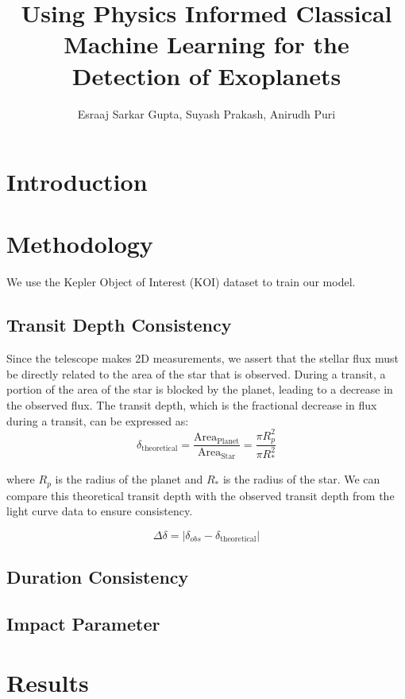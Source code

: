 \documentclass{article}
\title{Using Physics Informed Classical Machine Learning for the Detection of Exoplanets}
\author{Esraaj Sarkar Gupta, Suyash Prakash, Anirudh Puri}
\begin{document}
\maketitle

\section{Introduction}


\section{Methodology}
We use the Kepler Object of Interest (KOI) dataset to train our model.

\subsection{Transit Depth Consistency}
Since the telescope makes 2D measurements, we assert that the stellar flux must be directly related to the area of the star that is observed. During a transit, a portion of the area of the star is blocked by the planet, leading to a decrease in the observed flux. The transit depth, which is the fractional decrease in flux during a transit, can be expressed as:
\begin{equation}
    \delta_\text{theoretical} = \frac{\text{Area}_\text{Planet}}{\text{Area}_\text{Star}} = \frac{\pi R_p^2}{\pi R_*^2}
\end{equation}

where $R_p$ is the radius of the planet and $R_*$ is the radius of the star. We can compare this theoretical transit depth with the observed transit depth from the light curve data to ensure consistency.

\begin{equation}
    \Delta\delta = \Bigg|\delta_{obs} - \delta_\text{theoretical}\Bigg|
\end{equation}

\subsection{Duration Consistency}


\subsection{Impact Parameter}

\section{Results}
\end{document}
